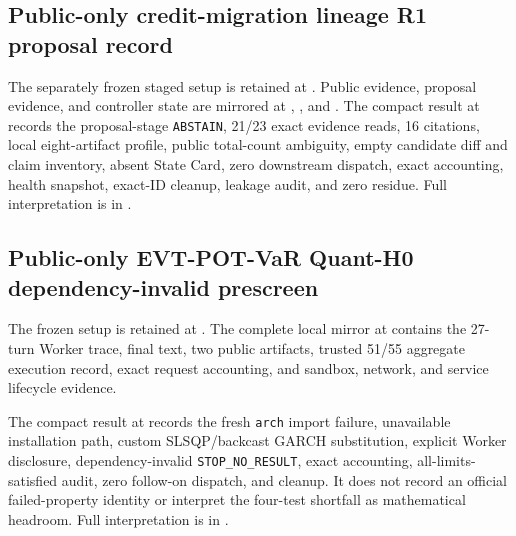 \subsection{Public-only credit-migration lineage R1 proposal record}

The separately frozen staged setup is retained at
.
Public evidence, proposal evidence, and controller state are mirrored at
,
,
and
.
The compact result at
records the proposal-stage \texttt{ABSTAIN}, 21/23 exact evidence reads, 16
citations, local eight-artifact profile, public total-count ambiguity, empty
candidate diff and claim inventory, absent State Card, zero downstream
dispatch, exact accounting, health snapshot, exact-ID cleanup, leakage audit,
and zero residue. Full interpretation is in
.

\subsection{Public-only EVT-POT-VaR Quant-H0 dependency-invalid prescreen}

The frozen setup is retained at
. The
complete local mirror at
contains the 27-turn Worker trace, final text, two public artifacts, trusted
51/55 aggregate execution record, exact request accounting, and sandbox,
network, and service lifecycle evidence.

The compact result at
records the fresh \texttt{arch} import failure, unavailable installation path,
custom SLSQP/backcast GARCH substitution, explicit Worker disclosure,
dependency-invalid \texttt{STOP\_NO\_RESULT}, exact accounting, all-limits-
satisfied audit, zero follow-on dispatch, and cleanup. It does not record an
official failed-property identity or interpret the four-test shortfall as
mathematical headroom. Full interpretation is in
.

